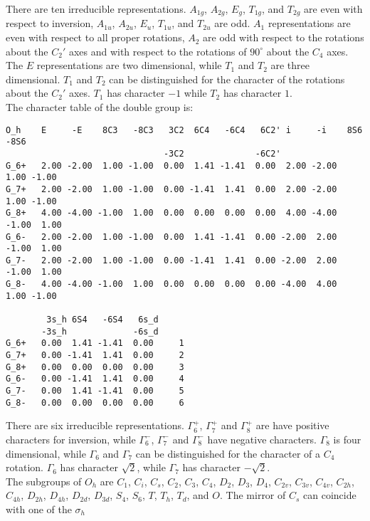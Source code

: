 \documentclass[12pt,a4paper]{article}
\begin{document}
There are ten irreducible representations. $A_{1g}$, $A_{2g}$, $E_g$,
$T_{1g}$, and $T_{2g}$ are even with respect to inversion, $A_{1u}$, 
$A_{2u}$, $E_u$, $T_{1u}$, and $T_{2u}$ are odd. $A_1$ representations are even
with respect to all proper rotations, $A_2$ are odd with respect to
the rotations about the $C_2'$ axes and with respect to the rotations
of $90^\circ$ about the $C_4$ axes. The $E$ representations are two
dimensional, while $T_1$ and $T_2$ are three dimensional. $T_1$ and $T_2$
can be distinguished for the character of the rotations about the $C_2'$
axes. $T_1$ has character $-1$ while $T_2$ has character $1$. \\
The character table of the double group is:
\begin{footnotesize}
\begin{verbatim}
O_h    E     -E    8C3   -8C3   3C2  6C4   -6C4   6C2' i     -i    8S6   -8S6 
                               -3C2              -6C2'                        
G_6+   2.00 -2.00  1.00 -1.00  0.00  1.41 -1.41  0.00  2.00 -2.00  1.00 -1.00
G_7+   2.00 -2.00  1.00 -1.00  0.00 -1.41  1.41  0.00  2.00 -2.00  1.00 -1.00
G_8+   4.00 -4.00 -1.00  1.00  0.00  0.00  0.00  0.00  4.00 -4.00 -1.00  1.00
G_6-   2.00 -2.00  1.00 -1.00  0.00  1.41 -1.41  0.00 -2.00  2.00 -1.00  1.00
G_7-   2.00 -2.00  1.00 -1.00  0.00 -1.41  1.41  0.00 -2.00  2.00 -1.00  1.00
G_8-   4.00 -4.00 -1.00  1.00  0.00  0.00  0.00  0.00 -4.00  4.00  1.00 -1.00

        3s_h 6S4   -6S4   6s_d
       -3s_h             -6s_d
G_6+   0.00  1.41 -1.41  0.00     1
G_7+   0.00 -1.41  1.41  0.00     2
G_8+   0.00  0.00  0.00  0.00     3
G_6-   0.00 -1.41  1.41  0.00     4
G_7-   0.00  1.41 -1.41  0.00     5
G_8-   0.00  0.00  0.00  0.00     6
\end{verbatim}
\end{footnotesize}
There are six irreducible representations. $\Gamma_6^+$, $\Gamma_7^+$ and
$\Gamma_8^+$ are have positive characters for inversion, while
$\Gamma_6^-$, $\Gamma_7^-$ and $\Gamma_8^-$ have negative characters.
$\Gamma_8$ is four dimensional, while $\Gamma_6$ and $\Gamma_7$ can be
distinguished for the character of a $C_4$ rotation. $\Gamma_6$ has 
character $\sqrt{2}$, while $\Gamma_7$ has character $-\sqrt{2}.$ \\
The subgroups of $O_h$ are $C_1$, $C_i$, $C_s$, $C_2$, $C_3$, $C_4$,
$D_2$, $D_3$, $D_4$, $C_{2v}$, $C_{3v}$, $C_{4v}$, $C_{2h}$, $C_{4h}$, 
$D_{2h}$, $D_{4h}$, $D_{2d}$, $D_{3d}$, $S_4$, $S_6$, $T$, $T_h$, 
$T_d$, and $O$. The mirror of $C_s$ can coincide with one of the $\sigma_h$ 
\end{document}
